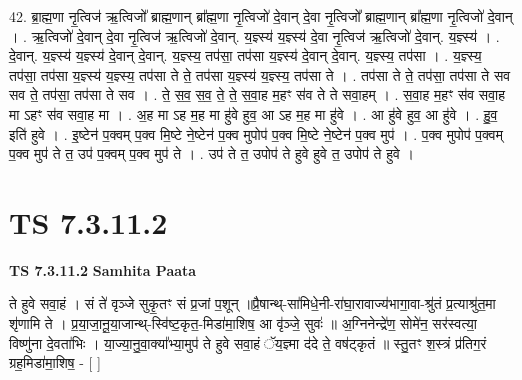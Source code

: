 \documentclass[17pt]{extarticle}
\begin{document}
42. ब्रा॒ह्म॒णा नृ॒त्विज॑ ऋ॒त्विजो᳚ ब्राह्म॒णान् ब्रा᳚ह्म॒णा नृ॒त्विजो॑ दे॒वान् दे॒वा नृ॒त्विजो᳚ ब्राह्म॒णान् ब्रा᳚ह्म॒णा नृ॒त्विजो॑ दे॒वान् । . ऋ॒त्विजो॑ दे॒वान् दे॒वा नृ॒त्विज॑ ऋ॒त्विजो॑ दे॒वान्. य॒ज्ञ्स्य॑ य॒ज्ञ्स्य॑ दे॒वा नृ॒त्विज॑ ऋ॒त्विजो॑ दे॒वान्. य॒ज्ञ्स्य॑ । . दे॒वान्. य॒ज्ञ्स्य॑ य॒ज्ञ्स्य॑ दे॒वान् दे॒वान्. य॒ज्ञ्स्य॒ तप॑सा॒ तप॑सा य॒ज्ञ्स्य॑ दे॒वान् दे॒वान्. य॒ज्ञ्स्य॒ तप॑सा । . य॒ज्ञ्स्य॒ तप॑सा॒ तप॑सा य॒ज्ञ्स्य॑ य॒ज्ञ्स्य॒ तप॑सा ते ते॒ तप॑सा य॒ज्ञ्स्य॑ य॒ज्ञ्स्य॒ तप॑सा ते । . तप॑सा ते ते॒ तप॑सा॒ तप॑सा ते सव सव ते॒ तप॑सा॒ तप॑सा ते सव । . ते॒ स॒व॒ स॒व॒ ते॒ ते॒ स॒वा॒ह म॒हꣳ स॑व ते ते सवा॒हम् । . स॒वा॒ह म॒हꣳ स॑व सवा॒ह मा ऽहꣳ स॑व सवा॒ह मा । . अ॒ह मा ऽह म॒ह मा हु॑वे हुव॒ आ ऽह म॒ह मा हु॑वे । . आ हु॑वे हुव॒ आ हु॑वे । . हु॒व॒ इति॑ हुवे । . इ॒ष्टेन॑ प॒क्वम् प॒क्व मि॒ष्टे ने॒ष्टेन॑ प॒क्व मुपोप॑ प॒क्व मि॒ष्टे ने॒ष्टेन॑ प॒क्व मुप॑ । . प॒क्व मुपोप॑ प॒क्वम् प॒क्व मुप॑ ते त॒ उप॑ प॒क्वम् प॒क्व मुप॑ ते । . उप॑ ते त॒ उपोप॑ ते हुवे हुवे त॒ उपोप॑ ते हुवे । \newline
\pagebreak
{}

\section{ TS 7.3.11.2 }

\textbf{TS 7.3.11.2 } \newline
\textbf{Samhita Paata} \newline

ते हुवे सवा॒हं । सं ते॑ वृञ्जे सुकृ॒तꣳ सं प्र॒जां प॒शून् ॥प्रै॒षान्थ्-सा॑मिधे॒नी-रा॑घा॒रावाज्य॑भागा॒वा-श्रु॑तं प्र॒त्याश्रु॑त॒मा शृ॑णामि ते । प्र॒या॒जा॒नू॒या॒जान्थ्-स्वि॑ष्ट॒कृत॒-मिडा॑मा॒शिष॒ आ वृ॑ञ्जे॒ सुवः॑ ॥ अ॒ग्निनेन्द्रे॑ण॒ सोमे॑न॒ सर॑स्वत्या॒ विष्णु॑ना दे॒वता॑भिः । या॒ज्या॒नु॒वा॒क्या᳚भ्या॒मुप॑ ते हुवे सवा॒हं ॅय॒ज्ञ्मा द॑दे ते॒ वष॑ट्कृतं ॥ स्तु॒तꣳ श॒स्त्रं प्र॑तिग॒रं ग्रह॒मिडा॑मा॒शिष॒ - [  ] \newline
\end{document}
